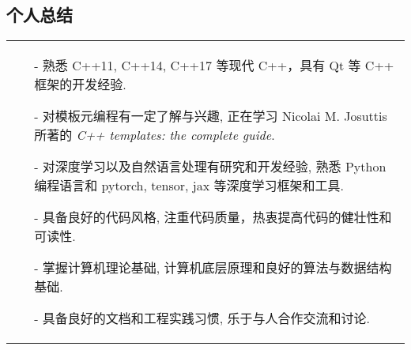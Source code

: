 \documentclass[a4paper,12pt]{article}
\begin{document}
\begin{CJK*}{UTF8}{gbsn}
\section{个人总结}
\begin{tabularx}{\linewidth}{ X@{}  }
\begin{minipage}[t]{\linewidth}
    \begin{itemize}[nosep,after=\strut, leftmargin=1em, itemsep=3pt]
        \item[-] 熟悉 C++11, C++14, C++17 等现代 C++，具有 Qt 等 C++ 框架的开发经验.
        \item[-] 对模板元编程有一定了解与兴趣, 正在学习 Nicolai M. Josuttis 所著的 \textit{C++ templates: the complete guide}.
        \item[-] 对深度学习以及自然语言处理有研究和开发经验, 熟悉 Python 编程语言和 pytorch, tensor, jax 等深度学习框架和工具.
        \item[-] 具备良好的代码风格, 注重代码质量，热衷提高代码的健壮性和可读性.
        \item[-] 掌握计算机理论基础, 计算机底层原理和良好的算法与数据结构基础.
        \item[-] 具备良好的文档和工程实践习惯, 乐于与人合作交流和讨论.
    \end{itemize}
\end{minipage}\\
\end{tabularx}
\vfill
{}
\end{CJK*}
\end{document}
